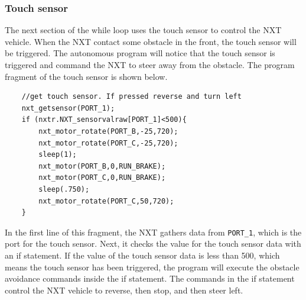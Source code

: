 \documentclass[12pt]{article}
\begin{document}
\subsubsection*{Touch sensor}
The next section of the while loop uses the touch sensor to control the NXT vehicle.
When the NXT contact some obstacle in the front, the touch sensor will be triggered.
The autonomous program will notice that the touch sensor is triggered and command the NXT to steer away from the obstacle.
The program fragment of the touch sensor is shown below.
\begin{verbatim}
    //get touch sensor. If pressed reverse and turn left
    nxt_getsensor(PORT_1);
    if (nxtr.NXT_sensorvalraw[PORT_1]<500){
        nxt_motor_rotate(PORT_B,-25,720);
        nxt_motor_rotate(PORT_C,-25,720);
        sleep(1);
        nxt_motor(PORT_B,0,RUN_BRAKE);
        nxt_motor(PORT_C,0,RUN_BRAKE);
        sleep(.750);
        nxt_motor_rotate(PORT_C,50,720);
    }
\end{verbatim}
In the first line of this fragment, the NXT gathers data from \verb+PORT_1+, which is the port for the touch sensor.
Next, it checks the value for the touch sensor data with an if statement.
If the value of the touch sensor data is less than 500, which means the touch sensor has been triggered, the program
    will execute the obstacle avoidance commands inside the if statement.
The commands in the if statement control the NXT vehicle to reverse, then stop, and then steer left.
\end{document}
